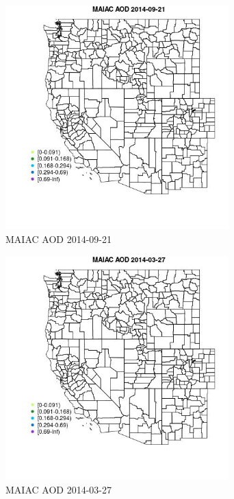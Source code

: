\begin{figure} 
\centering  
\includegraphics[width=0.77\textwidth]{Code_Outputs/Report_ML_input_PM25_Step4_part_e_de_duplicated_aveswNAs_MapObsMAIAC_AOD2014-09-21.jpg} 
\caption{\label{fig:Report_ML_input_PM25_Step4_part_e_de_duplicated_aveswNAsMapObsMAIAC_AOD2014-09-21}MAIAC AOD 2014-09-21} 
\end{figure} 
 

\clearpage 

\begin{figure} 
\centering  
\includegraphics[width=0.77\textwidth]{Code_Outputs/Report_ML_input_PM25_Step4_part_e_de_duplicated_aveswNAs_MapObsMAIAC_AOD2014-03-27.jpg} 
\caption{\label{fig:Report_ML_input_PM25_Step4_part_e_de_duplicated_aveswNAsMapObsMAIAC_AOD2014-03-27}MAIAC AOD 2014-03-27} 
\end{figure} 
 

